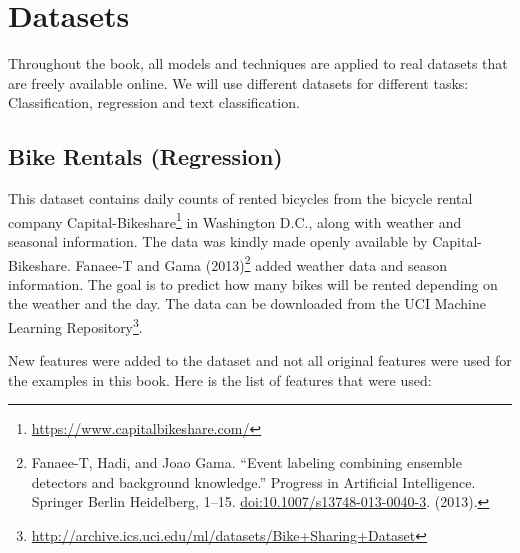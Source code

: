 \documentclass[12pt,]{krantz}
\renewcommand{\href}[2]{#2\footnote{\url{#1}}}
\begin{document}
\hypertarget{data}{\chapter{Datasets}\label{data}}

Throughout the book, all models and techniques are applied to real
datasets that are freely available online. We will use different
datasets for different tasks: Classification, regression and text
classification.

\hypertarget{bike-data}{\section{Bike Rentals
(Regression)}\label{bike-data}}

This dataset contains daily counts of rented bicycles from the bicycle
rental company
\href{https://www.capitalbikeshare.com/}{Capital-Bikeshare} in
Washington D.C., along with weather and seasonal information. The data
was kindly made openly available by Capital-Bikeshare. Fanaee-T and Gama
(2013)\footnote{Fanaee-T, Hadi, and Joao Gama. ``Event labeling
  combining ensemble detectors and background knowledge.'' Progress in
  Artificial Intelligence. Springer Berlin Heidelberg, 1--15.
  \url{doi:10.1007/s13748-013-0040-3}. (2013).} added weather data and
season information. The goal is to predict how many bikes will be rented
depending on the weather and the day. The data can be downloaded from
the
\href{http://archive.ics.uci.edu/ml/datasets/Bike+Sharing+Dataset}{UCI
Machine Learning Repository}.

New features were added to the dataset and not all original features
were used for the examples in this book. Here is the list of features
that were used:
\end{document}

